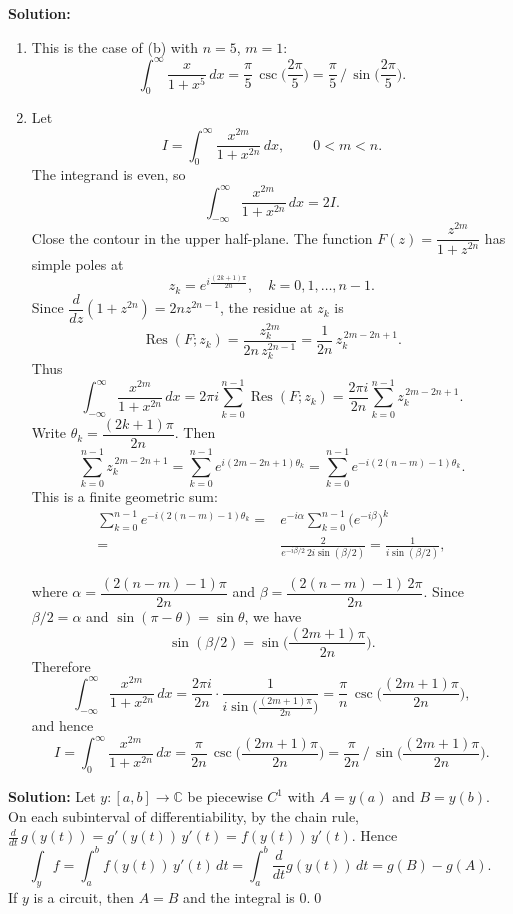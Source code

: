 \bigskip\noindent\textbf{Solution:}
\begin{enumerate}[label=(\alph*)]
\item This is the case of (b) with $n=5$, $m=1$:
\[\int_0^{\infty}\frac{x}{1+x^5}\,dx=\frac{\pi}{5}\,\csc\!\Big(\frac{2\pi}{5}\Big)=\frac{\pi}{5}\,\Big/\,\sin\!\Big(\frac{2\pi}{5}\Big).\]

\item Let
\[I=\int_0^{\infty}\frac{x^{2m}}{1+x^{2n}}\,dx,\qquad 0<m<n.\]
The integrand is even, so
\[\int_{-\infty}^{\infty}\frac{x^{2m}}{1+x^{2n}}\,dx=2I.\]
Close the contour in the upper half-plane. The function $F(z)=\dfrac{z^{2m}}{1+z^{2n}}$ has simple poles at
\[z_k=e^{i\frac{(2k+1)\pi}{2n}},\quad k=0,1,\dots,n-1.\]
Since $\dfrac{d}{dz}(1+z^{2n})=2n z^{2n-1}$, the residue at $z_k$ is
\[\operatorname{Res}(F;z_k)=\frac{z_k^{2m}}{2n\,z_k^{2n-1}}=\frac{1}{2n}\,z_k^{\,2m-2n+1}.\]
Thus
\[\int_{-\infty}^{\infty}\frac{x^{2m}}{1+x^{2n}}\,dx=2\pi i\sum_{k=0}^{n-1}\operatorname{Res}(F;z_k)=\frac{2\pi i}{2n}\sum_{k=0}^{n-1} z_k^{\,2m-2n+1}.\]
Write $\theta_k=\dfrac{(2k+1)\pi}{2n}$. Then
\[\sum_{k=0}^{n-1} z_k^{\,2m-2n+1}=\sum_{k=0}^{n-1} e^{i(2m-2n+1)\theta_k}=\sum_{k=0}^{n-1} e^{-i(2(n-m)-1)\theta_k}.
\]
This is a finite geometric sum:
\begin{align*}
\sum_{k=0}^{n-1} e^{-i(2(n-m)-1)\theta_k}=& e^{-i\alpha}\sum_{k=0}^{n-1} \Big(e^{-i\beta}\Big)^k \\
=&\frac{2}{e^{-i\beta/2}\,2i\sin(\beta/2)}=\frac{1}{i\sin(\beta/2)},
\end{align*}

where $\alpha=\dfrac{(2(n-m)-1)\pi}{2n}$ and $\beta=\dfrac{(2(n-m)-1)\,2\pi}{2n}$. Since $\beta/2=\alpha$ and $\sin(\pi-\theta)=\sin\theta$, we have
\[\sin(\beta/2)=\sin\!\Big(\frac{(2m+1)\pi}{2n}\Big).\]
Therefore
\[\int_{-\infty}^{\infty}\frac{x^{2m}}{1+x^{2n}}\,dx=\frac{2\pi i}{2n}\cdot\frac{1}{i\sin\!\big(\frac{(2m+1)\pi}{2n}\big)}=\frac{\pi}{n}\,\csc\!\Big(\frac{(2m+1)\pi}{2n}\Big),\]
and hence
\[I=\int_0^{\infty}\frac{x^{2m}}{1+x^{2n}}\,dx=\frac{\pi}{2n}\,\csc\!\Big(\frac{(2m+1)\pi}{2n}\Big)=\frac{\pi}{2n}\,\Big/\,\sin\!\Big(\frac{(2m+1)\pi}{2n}\Big).\]
\end{enumerate}

\bigskip\noindent\textbf{Solution:}
Let $y:[a,b]\to\mathbb C$ be piecewise $C^1$ with $A=y(a)$ and $B=y(b)$. On each subinterval of differentiability, by the chain rule, $\frac{d}{dt}\,g(y(t))=g'(y(t))\,y'(t)=f(y(t))\,y'(t)$. Hence
\[\int_y f=\int_a^b f(y(t))\,y'(t)\,dt=\int_a^b \frac{d}{dt}g(y(t))\,dt=g(B)-g(A).\]
If $y$ is a circuit, then $A=B$ and the integral is $0$.\qed


